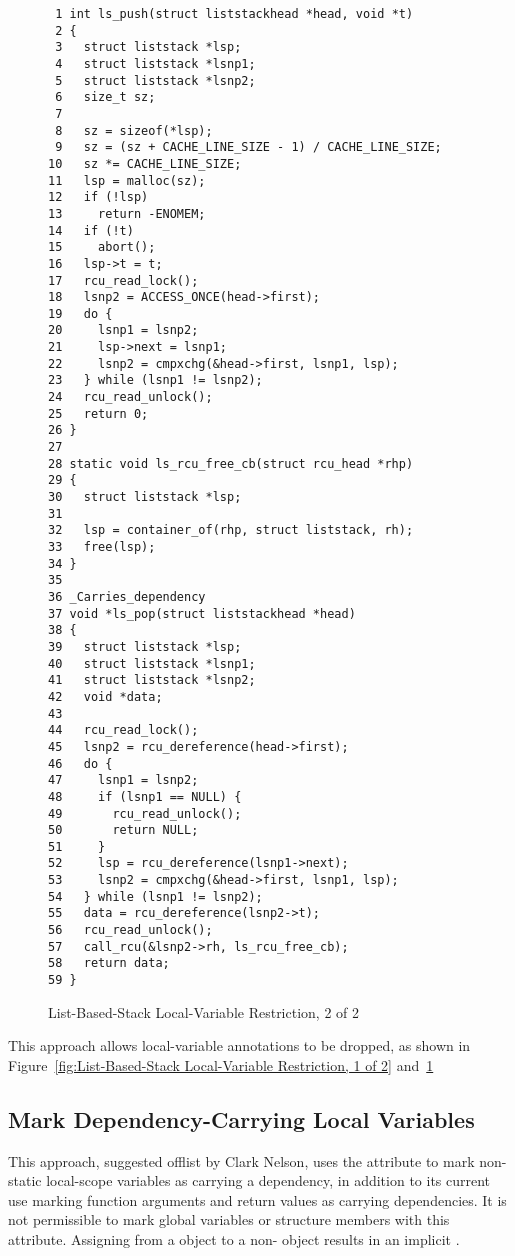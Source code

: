 \documentclass[letterpaper,twocolumn,10pt]{article}
\begin{document}
\begin{figure}[tbp]
{ \scriptsize
\begin{verbatim}
 1 int ls_push(struct liststackhead *head, void *t)
 2 {
 3   struct liststack *lsp;
 4   struct liststack *lsnp1;
 5   struct liststack *lsnp2;
 6   size_t sz;
 7 
 8   sz = sizeof(*lsp);
 9   sz = (sz + CACHE_LINE_SIZE - 1) / CACHE_LINE_SIZE;
10   sz *= CACHE_LINE_SIZE;
11   lsp = malloc(sz);
12   if (!lsp)
13     return -ENOMEM;
14   if (!t)
15     abort();
16   lsp->t = t;
17   rcu_read_lock();
18   lsnp2 = ACCESS_ONCE(head->first);
19   do {
20     lsnp1 = lsnp2;
21     lsp->next = lsnp1;
22     lsnp2 = cmpxchg(&head->first, lsnp1, lsp);
23   } while (lsnp1 != lsnp2);
24   rcu_read_unlock();
25   return 0;
26 }
27 
28 static void ls_rcu_free_cb(struct rcu_head *rhp)
29 {
30   struct liststack *lsp;
31 
32   lsp = container_of(rhp, struct liststack, rh);
33   free(lsp);
34 }
35 
36 _Carries_dependency
37 void *ls_pop(struct liststackhead *head)
38 {
39   struct liststack *lsp;
40   struct liststack *lsnp1;
41   struct liststack *lsnp2;
42   void *data;
43 
44   rcu_read_lock();
45   lsnp2 = rcu_dereference(head->first);
46   do {
47     lsnp1 = lsnp2;
48     if (lsnp1 == NULL) {
49       rcu_read_unlock();
50       return NULL;
51     }
52     lsp = rcu_dereference(lsnp1->next);
53     lsnp2 = cmpxchg(&head->first, lsnp1, lsp);
54   } while (lsnp1 != lsnp2);
55   data = rcu_dereference(lsnp2->t);
56   rcu_read_unlock();
57   call_rcu(&lsnp2->rh, ls_rcu_free_cb);
58   return data;
59 }
\end{verbatim}
}
\caption{List-Based-Stack Local-Variable Restriction, 2 of 2}
\label{fig:List-Based-Stack Local-Variable Restriction, 2 of 2}
\end{figure}

This approach allows local-variable annotations to be dropped, as
shown in
Figure~\ref{fig:List-Based-Stack Local-Variable Restriction, 1 of 2}
and~\ref{fig:List-Based-Stack Local-Variable Restriction, 2 of 2}

\subsection{Mark Dependency-Carrying Local Variables}
\label{sec:Mark Dependency-Carrying Local Variables}

This approach, suggested offlist by Clark Nelson, uses the
 attribute to mark non-static local-scope
variables as carrying a dependency, in addition to its current use
marking function arguments and return values as carrying dependencies.
It is not permissible to mark global variables or structure members
with this attribute.
Assigning from a  object to a
non- object results in an implicit
.
\end{document}
